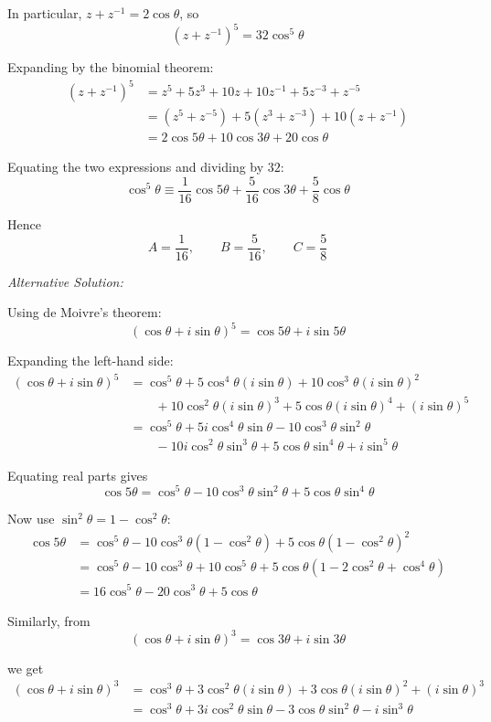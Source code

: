 \documentclass[leqno]{article}
\begin{document}
\begin{enumerate}[
  label=\textbf{\arabic*.},
  leftmargin=*,
  topsep=0pt,
  partopsep=0pt,
  parsep=0pt
]
\begin{djsSolution}
\begin{enumerate}[label=\textbf{(\alph*)}]
  In particular, \(z+z^{-1}=2\cos\theta\), so
  \[
  (z+z^{-1})^5=32\cos^5\theta
  \]

  Expanding by the binomial theorem:
  \begin{align*}
  (z+z^{-1})^5
  &=z^5+5z^3+10z+10z^{-1}+5z^{-3}+z^{-5} \\
  &=(z^5+z^{-5})+5(z^3+z^{-3})+10(z+z^{-1}) \\
  &=2\cos 5\theta+10\cos 3\theta+20\cos\theta
  \end{align*}

  Equating the two expressions and dividing by \(32\):
  \[
  \cos^5\theta\equiv\frac1{16}\cos 5\theta+\frac5{16}\cos 3\theta+\frac58\cos\theta
  \]

  Hence
  \[
  A=\frac1{16},\qquad B=\frac5{16},\qquad C=\frac58
  \]

  \medskip

  \textit{Alternative Solution:}

  Using de Moivre's theorem:
  \[
  (\cos\theta+i\sin\theta)^5=\cos 5\theta+i\sin 5\theta
  \]

  Expanding the left-hand side:
  \begin{align*}
  (\cos\theta+i\sin\theta)^5
  &=\cos^5\theta+5\cos^4\theta(i\sin\theta)+10\cos^3\theta(i\sin\theta)^2 \\
  &\qquad +10\cos^2\theta(i\sin\theta)^3+5\cos\theta(i\sin\theta)^4+(i\sin\theta)^5 \\
  &=\cos^5\theta+5i\cos^4\theta\sin\theta-10\cos^3\theta\sin^2\theta \\
  &\qquad -10i\cos^2\theta\sin^3\theta+5\cos\theta\sin^4\theta+i\sin^5\theta
  \end{align*}

  Equating real parts gives
  \[
  \cos 5\theta=\cos^5\theta-10\cos^3\theta\sin^2\theta+5\cos\theta\sin^4\theta
  \]

  Now use \(\sin^2\theta=1-\cos^2\theta\):
  \begin{align*}
  \cos 5\theta
  &=\cos^5\theta-10\cos^3\theta(1-\cos^2\theta)+5\cos\theta(1-\cos^2\theta)^2 \\
  &=\cos^5\theta-10\cos^3\theta+10\cos^5\theta+5\cos\theta(1-2\cos^2\theta+\cos^4\theta) \\
  &=16\cos^5\theta-20\cos^3\theta+5\cos\theta
  \end{align*}

  Similarly, from
  \[
  (\cos\theta+i\sin\theta)^3=\cos 3\theta+i\sin 3\theta
  \]

  we get
  \begin{align*}
  (\cos\theta+i\sin\theta)^3
  &=\cos^3\theta+3\cos^2\theta(i\sin\theta)+3\cos\theta(i\sin\theta)^2+(i\sin\theta)^3 \\
  &=\cos^3\theta+3i\cos^2\theta\sin\theta-3\cos\theta\sin^2\theta-i\sin^3\theta
  \end{align*}


\end{enumerate}
\end{djsSolution}
\end{enumerate}
\end{document}
